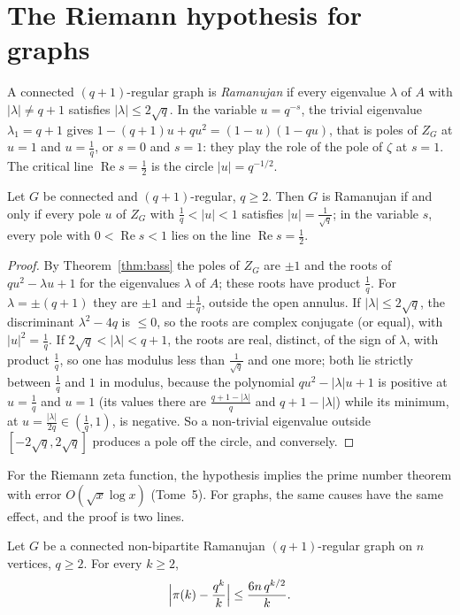 \section{The Riemann hypothesis for graphs}

A connected $(q+1)$-regular graph is \emph{Ramanujan} if every eigenvalue $\lambda$ of $A$ with $|\lambda|\ne q+1$ satisfies $|\lambda|\le2\sqrt q$. In the variable $u=q^{-s}$, the trivial eigenvalue $\lambda_1=q+1$ gives
$1-(q+1)u+qu^2=(1-u)(1-qu)$, that is poles of $Z_G$ at $u=1$ and $u=\frac1q$, or $s=0$ and $s=1$: they play the role of the pole of $\zeta$ at $s=1$. The critical line $\operatorname{Re}s=\frac12$ is the circle $|u|=q^{-1/2}$.

\begin{theorem}[Sunada, 1986]\label{thm:graphRH}
Let $G$ be connected and $(q+1)$-regular, $q\ge2$. Then $G$ is Ramanujan if and only if every pole $u$ of $Z_G$ with $\frac1q<|u|<1$ satisfies $|u|=\frac1{\sqrt q}$; in the variable $s$, every pole with $0<\operatorname{Re}s<1$ lies on
the line $\operatorname{Re}s=\frac12$.
\end{theorem}

\begin{proof}
By Theorem~\ref{thm:bass} the poles of $Z_G$ are $\pm1$ and the roots of $qu^2-\lambda u+1$ for the eigenvalues $\lambda$ of $A$; these roots have product $\frac1q$. For $\lambda=\pm(q+1)$ they are $\pm1$ and $\pm\frac1q$, outside the open annulus.
If $|\lambda|\le2\sqrt q$, the discriminant $\lambda^2-4q$ is $\le0$, so the roots are complex conjugate (or equal), with $|u|^2=\frac1q$. If $2\sqrt q<|\lambda|<q+1$, the roots are real, distinct, of the sign of $\lambda$, with
product $\frac1q$, so one has modulus less than $\frac1{\sqrt q}$ and one more; both lie strictly between $\frac1q$ and $1$ in modulus, because the polynomial $qu^2-|\lambda|u+1$ is positive at $u=\frac1q$ and $u=1$
(its values there are $\frac{q+1-|\lambda|}q$ and $q+1-|\lambda|$) while its minimum, at $u=\frac{|\lambda|}{2q}\in(\frac1q,1)$, is negative. So a non-trivial eigenvalue outside $[-2\sqrt q,2\sqrt q]$ produces a pole off the circle, and
conversely.
\end{proof}

For the Riemann zeta function, the hypothesis implies the prime number theorem with error $O(\sqrt x\log x)$ (Tome~5). For graphs, the same causes have the same effect, and the proof is two lines.

\begin{theorem}\label{thm:graphpnt}
Let $G$ be a connected non-bipartite Ramanujan $(q+1)$-regular graph on $n$ vertices, $q\ge2$. For every $k\ge2$,
\[
\Bigl|\pi(k)-\frac{q^k}k\Bigr|\le\frac{6n\,q^{k/2}}k.
\]
\end{theorem}

